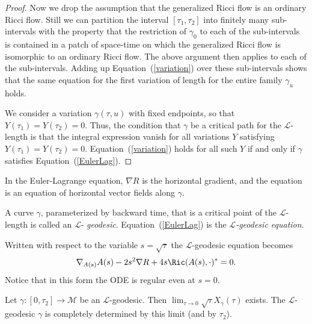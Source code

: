 \begin{proof}
Now we drop the assumption that the generalized Ricci flow is an
ordinary Ricci flow. Still we can partition the interval
$[\tau_1,\tau_2]$ into finitely many sub-intervals with the property
that the restriction of $\gamma_0$ to each of the sub-intervals is
contained in a patch of space-time on which the generalized Ricci
flow is isomorphic to an ordinary Ricci flow. The above argument
then applies to each of the sub-intervals. Adding up
Equation~(\ref{variation}) over these sub-intervals shows that the
same equation for the first variation of length for the entire
family $\gamma_u$ holds.


We consider a variation $\gamma(\tau,u)$ with fixed endpoints, so
that  $Y(\tau_{1})=Y(\tau_{2})= 0.$ Thus, the condition that
$\gamma$ be a critical path for the ${\mathcal L}$-length is that
the integral expression vanish for all variations $Y$ satisfying
$Y(\tau_1)=Y(\tau_2)=0$. Equation~(\ref{variation}) holds for all
such $Y$ if and only if $\gamma$ satisfies
Equation~(\ref{EulerLag}).
\end{proof}

\begin{remark}\label{rem:horizontal-gradient-convention}
In the Euler-Lagrange equation, $\nabla R$ is the horizontal
gradient, and the equation is an equation of horizontal vector
fields along $\gamma$.
\end{remark}

\begin{definition}\label{def:l-geodesic}
A curve $\gamma$, parameterized by backward time, that is a critical
point of the ${\mathcal L}$-length is called an $\mathcal{L}$-{\em
geodesic}.
Equation~(\ref{EulerLag}) is the {\em ${\mathcal L}$-geodesic
equation}.
\end{definition}


Written with respect to the variable $s=\sqrt{\tau}$ the
$\mathcal{L}$-geodesic equation becomes
\begin{equation}\label{reparam}
\nabla_{A(s)}A(s) -2s^{2}\nabla R + 4s\Ric(A(s),\cdot)^*=0.\end{equation}
 Notice that in this form the ODE is
regular even at $s=0$.



\begin{lemma}\label{lem:l-geodesic-initial-limit}
Let $\gamma\colon [0,\tau_2]\to {\mathcal M}$ be an ${\mathcal L}$-geodesic.
Then $\lim_{\tau\rightarrow 0}\sqrt{\tau}X_\gamma(\tau)$ exists. The
${\mathcal L}$-geodesic $\gamma$ is completely determined by this limit (and by
$\tau_2$).
\end{lemma}

